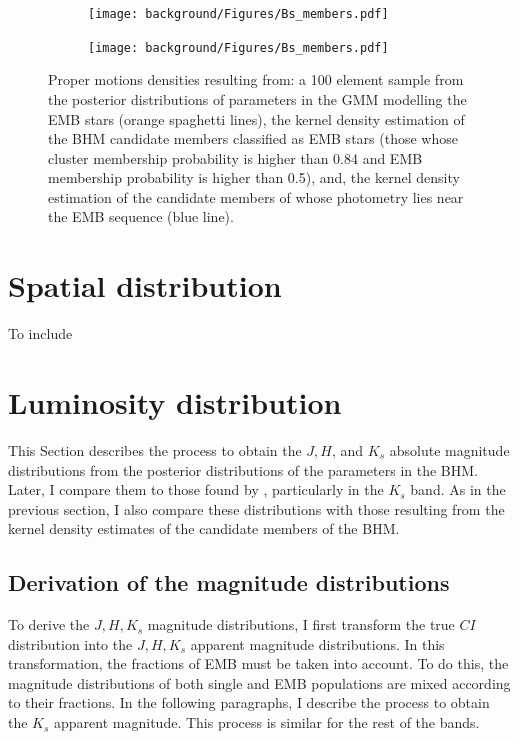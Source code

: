 \begin{figure}[ht!]
    \centering
    \begin{subfigure}[t]{0.45\textwidth}
    \centering
       \texttt{[image: background/Figures/Bs\_members.pdf]}
        \caption{}
    \end{subfigure}
    \begin{subfigure}[t]{0.45\textwidth}
    \centering
     \texttt{[image: background/Figures/Bs\_members.pdf]}
        \caption{}
    \end{subfigure}
\caption{Proper motions densities resulting from: a 100 element sample from the posterior distributions of parameters in the GMM modelling the EMB stars (orange spaghetti lines), the kernel density estimation of the BHM candidate members classified as EMB stars (those whose cluster membership probability is higher than 0.84 and EMB membership probability is higher than 0.5), and, the kernel density estimation of the candidate members of \citet{Bouy2015} whose photometry lies near the EMB sequence (blue line).}
\label{fig:PMBs}
\end{figure}

\section{Spatial distribution}
To include
\section{Luminosity distribution}
\label{sect:luminosity}
This Section describes the process to obtain the $J,H$, and $K_s$ absolute magnitude distributions from the posterior distributions of the parameters in the BHM. Later, I compare them to those found by \citet{Bouy2015}, particularly in the $K_s$ band. As in the previous section, I also compare these distributions with those resulting from the kernel density estimates of the candidate members of the BHM.

\subsection{Derivation of the magnitude distributions}
\label{subsect:deriveluminosity}
To derive the $J,H,K_s$ magnitude distributions, I first transform the true $CI$ distribution into the $J,H,K_s$ apparent magnitude distributions. In this transformation, the fractions of EMB must be taken into account. To do this, the magnitude distributions of both single and EMB populations are mixed according to their fractions. In the following paragraphs, I describe the process to obtain the $K_s$ apparent magnitude. This process is similar for the rest of the bands. 

